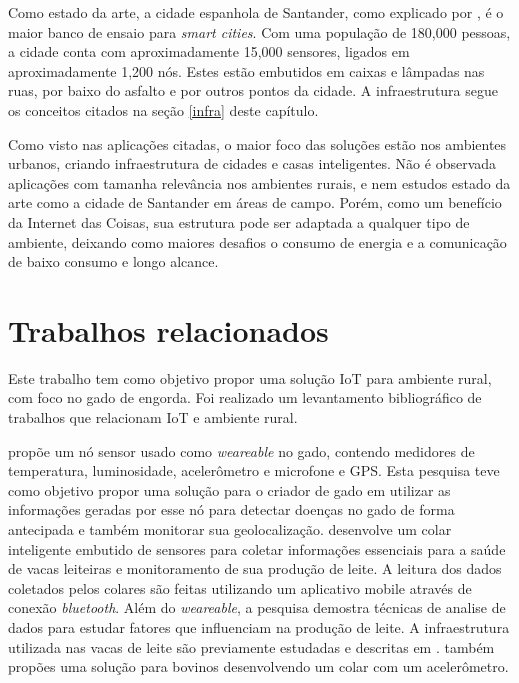 \documentclass[
    hidelinks,
	12pt,				%
	openany,
	oneside, 
	a4paper,			%
	english,			%
	french,				%
	spanish,			%
	brazil				%
	]{abntex2}
\begin{document}
Como estado da arte, a cidade espanhola de Santander, como explicado por \cite{cheng2015smartsantander}, é o maior banco de ensaio para \textit{smart cities}. Com uma população de 180,000 pessoas, a cidade conta com aproximadamente 15,000 sensores, ligados em aproximadamente 1,200 nós. Estes estão embutidos em caixas  e lâmpadas nas ruas, por baixo do asfalto e por outros pontos da cidade. A infraestrutura segue os conceitos citados na seção \ref{infra} deste capítulo.

Como visto nas aplicações citadas, o maior foco das soluções estão nos ambientes urbanos, criando infraestrutura de cidades e casas inteligentes. Não é observada aplicações com tamanha relevância nos ambientes rurais, e nem estudos estado da arte como a cidade de Santander em áreas de campo. Porém, como um benefício da Internet das Coisas, sua estrutura pode ser adaptada a qualquer tipo de ambiente, deixando como maiores desafios o consumo de energia e a comunicação de baixo consumo e longo alcance.

\section{Trabalhos relacionados}

Este trabalho tem como objetivo propor uma solução IoT para ambiente rural, com foco no gado de engorda. Foi realizado um levantamento bibliográfico de trabalhos que relacionam IoT e ambiente rural.

\cite{gokul2017cattlenode} propõe um nó sensor usado como \textit{weareable} no gado, contendo medidores de temperatura, luminosidade, acelerômetro e microfone e GPS. Esta pesquisa teve como objetivo propor uma solução para o criador de gado em utilizar as informações geradas por esse nó para detectar doenças no gado de forma antecipada e também monitorar sua geolocalização. \cite{Vuppalapati2017smartdairies} desenvolve um colar inteligente embutido de sensores para coletar informações essenciais para a saúde de vacas leiteiras e monitoramento de sua produção de leite. A leitura dos dados coletados pelos colares são feitas utilizando um aplicativo mobile através de conexão \textit{bluetooth}. Além do \textit{weareable}, a pesquisa demostra técnicas de analise de dados para estudar fatores que influenciam na produção de leite. A infraestrutura utilizada nas vacas de leite são previamente estudadas e descritas em \cite{Vuppalapati2015infra}. \cite{Maina2017accel} também propões uma solução para bovinos desenvolvendo um colar com um acelerômetro.
\end{document}
